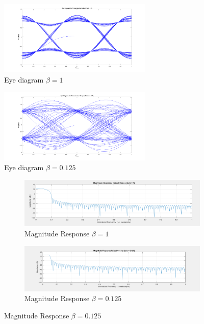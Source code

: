 \documentclass{article}
\begin{document}
\begin{figure}[h]
  \begin{center}
    \includegraphics[width=0.65\textwidth]{img/eye_diagram_beta_1.png}
    \caption{Eye diagram $\beta = 1$}
  \end{center}
\end{figure}

\begin{figure}[h]
  \begin{center}
    \includegraphics[width=0.65\textwidth]{img/eye_diagram_beta_125.png}
    \caption{Eye diagram $\beta = 0.125$}
  \end{center}
\end{figure}

\begin{figure}[h]
  \begin{center}

    \begin{subfigure}[b]{0.5\linewidth}
      \includegraphics[width=\linewidth]{img/magnitude_response_beta_1.png}
      \caption{Magnitude Response $\beta = 1$}
    \end{subfigure}

    \begin{subfigure}[b]{0.5\linewidth}
      \includegraphics[width=\linewidth]{img/magnitude_response_beta_125.png}
      \caption{Magnitude Response $\beta = 0.125$}
    \end{subfigure}

  \end{center}
\end{figure}
\end{document}
